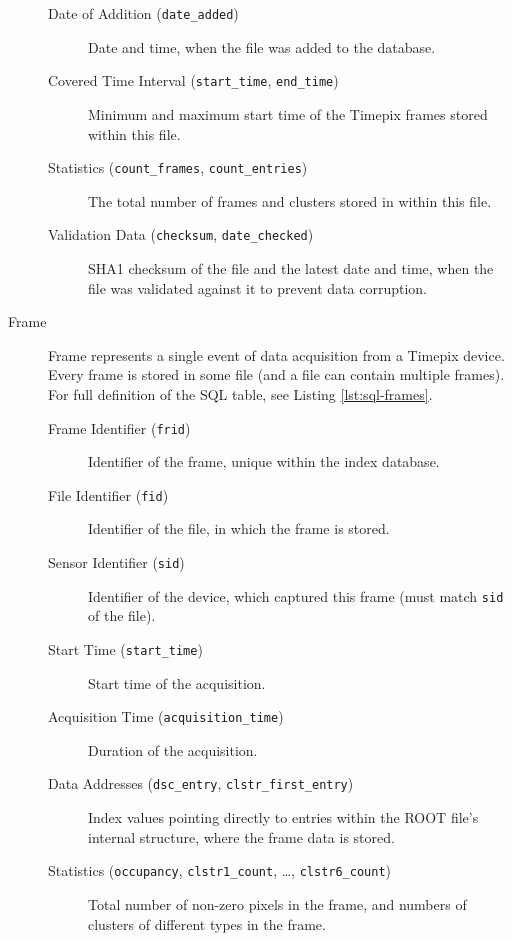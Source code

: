 \begin{description}
\begin{description}
		\item[Date of Addition (\texttt{date\_added})]
		Date and time, when the file was added to the database.

		\item[Covered Time Interval (\texttt{start\_time}, \texttt{end\_time})]
		Minimum and maximum start time of the Timepix frames stored within this file.

		\item[Statistics (\texttt{count\_frames}, \texttt{count\_entries})]
		The total number of frames and clusters stored in within this file.

		\item[Validation Data (\texttt{checksum}, \texttt{date\_checked})]
		SHA1 checksum of the file and the latest date and time, when the file was validated against it to prevent data corruption.
	\end{description}

	\item[Frame]
	Frame represents a single event of data acquisition from a Timepix device. Every frame is stored in some file (and a file can contain multiple frames). For full definition of the SQL table, see Listing \ref{lst:sql-frames}.

	\begin{description}
		\item[Frame Identifier (\texttt{frid})] 
		Identifier of the frame, unique within the index database.

		\item[File Identifier (\texttt{fid})]
		Identifier of the file, in which the frame is stored.

		\item[Sensor Identifier (\texttt{sid})] 
		Identifier of the device, which captured this frame (must match \texttt{sid} of the file).

		\item[Start Time (\texttt{start\_time})] 
		Start time of the acquisition.

		\item[Acquisition Time (\texttt{acquisition\_time})] 
		Duration of the acquisition.

		\item[Data Addresses (\texttt{dsc\_entry}, \texttt{clstr\_first\_entry})]
		Index values pointing directly to entries within the ROOT file's internal structure, where the frame data is stored.

		\item[Statistics (\texttt{occupancy}, \texttt{clstr1\_count}, \dots, \texttt{clstr6\_count})]
		Total number of non-zero pixels in the frame, and numbers of clusters of different types in the frame.
	\end{description}
\end{description}


